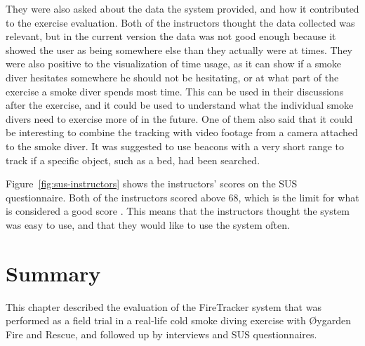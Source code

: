 \documentclass[../Main/thesis.tex]{subfiles}
\begin{document}
They were also asked about the data the system provided, and how it contributed to the exercise evaluation.
Both of the instructors thought the data collected was relevant, but in the current version the data was not good enough because it showed the user as being somewhere else than they actually were at times.
They were also positive to the visualization of time usage, as it can show if a smoke diver hesitates somewhere he should not be hesitating, or at what part of the exercise a smoke diver spends most time.
This can be used in their discussions after the exercise, and it could be used to understand what the individual smoke divers need to exercise more of in the future.
One of them also said that it could be interesting to combine the tracking with video footage from a camera attached to the smoke diver.
It was suggested to use beacons with a very short range to track if a specific object, such as a bed, had been searched.

Figure~\ref{fig:sus-instructors} shows the instructors' scores on the SUS questionnaire.
Both of the instructors scored above 68, which is the limit for what is considered a good score \citep{Brooke2013}.
This means that the instructors thought the system was easy to use, and that they would like to use the system often.


\section{Summary}
This chapter described the evaluation of the FireTracker system that was performed as a field trial in a real-life cold smoke diving exercise with Øygarden Fire and Rescue, and followed up by interviews and SUS questionnaires.
\end{document}
